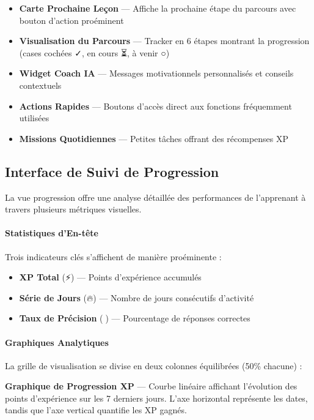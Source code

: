 \documentclass[12pt, a4paper]{report}
\begin{document}
\begin{itemize}
    \item \textbf{Carte Prochaine Leçon} --- Affiche la prochaine étape du parcours avec bouton d'action proéminent
    \item \textbf{Visualisation du Parcours} --- Tracker en 6 étapes montrant la progression (cases cochées ✓, en cours ⏳, à venir ○)
    \item \textbf{Widget Coach IA} --- Messages motivationnels personnalisés et conseils contextuels
    \item \textbf{Actions Rapides} --- Boutons d'accès direct aux fonctions fréquemment utilisées
    \item \textbf{Missions Quotidiennes} --- Petites tâches offrant des récompenses XP
\end{itemize}

\subsection{Interface de Suivi de Progression}

La vue progression offre une analyse détaillée des performances de l'apprenant à travers plusieurs métriques visuelles.

\paragraph{Statistiques d'En-tête}
Trois indicateurs clés s'affichent de manière proéminente :
\begin{itemize}
    \item \textbf{XP Total} (⚡) --- Points d'expérience accumulés
    \item \textbf{Série de Jours} (🔥) --- Nombre de jours consécutifs d'activité
    \item \textbf{Taux de Précision} (🎯) --- Pourcentage de réponses correctes
\end{itemize}

\paragraph{Graphiques Analytiques}
La grille de visualisation se divise en deux colonnes équilibrées (50\% chacune) :

\textbf{Graphique de Progression XP} --- Courbe linéaire affichant l'évolution des points d'expérience sur les 7 derniers jours. L'axe horizontal représente les dates, tandis que l'axe vertical quantifie les XP gagnés.
\end{document}
